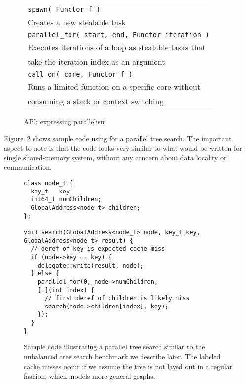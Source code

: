 \begin{figure}[htbp]
  \begin{center}
	\begin{tabular}{l}
    \texttt{\scriptsize spawn( Functor f )} \\
      Creates a new stealable task \\
    \texttt{\scriptsize parallel\_for( start, end, Functor iteration )} \\
      Executes iterations of a loop as stealable tasks that \\
      take the iteration index as an argument  \\
    \texttt{\scriptsize call\_on( core, Functor f )} \\ 
      Runs a limited function on a specific core without \\
      consuming a stack or context switching
	\end{tabular}
    \begin{minipage}{0.95\columnwidth}
      \caption{\label{fig:expressing-parallelism} \Grappa API: expressing parallelism
      } %
    \end{minipage}
  \end{center}
\end{figure}

Figure~\ref{fig:sample} shows sample code using \Grappa for a parallel tree
search. The important aspect to note is that the code looks very similar to
what would be written for single shared-memory system, without any concern about data locality or communication.

\begin{figure}[htbp]
\begin{center}
\begin{scriptsize}
\begin{lstlisting}[style=grappa]
class node_t {
  key_t   key
  int64_t numChildren;
  GlobalAddress<node_t> children;
};

void search(GlobalAddress<node_t> node, key_t key, GlobalAddress<node_t> result) {
  // deref of key is expected cache miss
  if (node->key == key) {
    delegate::write(result, node);
  } else {
    parallel_for(0, node->numChildren,
    [=](int index) {
      // first deref of children is likely miss
      search(node->children[index], key); 
    });
  }
}
\end{lstlisting}
\end{scriptsize}

    \begin{minipage}{0.95\columnwidth}
      \caption{\label{fig:sample} Sample \Grappa code illustrating a
          parallel tree search similar to the unbalanced tree search
          benchmark we describe later. The labeled cache misses occur
          if we assume the tree is not layed out in a regular fashion, which
      models more general graphs.}
    \end{minipage}

\end{center}
\end{figure}

